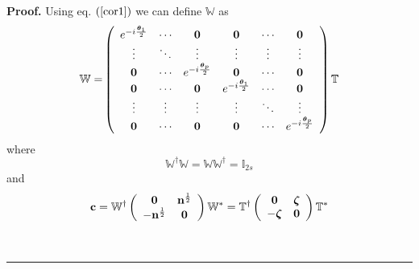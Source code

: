 \documentclass[aps,preprint]{revtex4}%
\newenvironment{proof}[1][Proof]{\noindent\textbf{#1.} }{\ \rule{0.5em}{0.5em}}
\begin{document}
\begin{proof}
Using eq. $\left(  \ref{cor1}\right)  $ we can define $\mathbb{W}$ as%
\begin{equation}
\mathbb{W=}\left(
\begin{array}
[c]{cccccc}%
e^{-i\frac{\boldsymbol{\theta}_{1}}{2}} & \mathbf{\cdots} & \mathbf{0} &
\mathbf{0} & \mathbf{\cdots} & \mathbf{0}\\
\mathbf{\vdots} & \mathbf{\ddots} & \mathbf{\vdots} & \mathbf{\vdots} &
\mathbf{\vdots} & \mathbf{\vdots}\\
\mathbf{0} & \mathbf{\cdots} & e^{-i\frac{\boldsymbol{\theta}_{p}}{2}} &
\mathbf{0} & \mathbf{\cdots} & \mathbf{0}\\
\mathbf{0} & \mathbf{\cdots} & \mathbf{0} & e^{-i\frac{\boldsymbol{\theta}_{1}%
}{2}} & \mathbf{\cdots} & \mathbf{0}\\
\mathbf{\vdots} & \mathbf{\vdots} & \mathbf{\vdots} & \mathbf{\vdots} &
\mathbf{\ddots} & \mathbf{\vdots}\\
\mathbf{0} & \mathbf{\cdots} & \mathbf{0} & \mathbf{0} & \mathbf{\cdots} &
e^{-i\frac{\boldsymbol{\theta}_{p}}{2}}%
\end{array}
\right)  \mathbb{T}%
\end{equation}
where
\begin{equation}
\mathbb{W}^{\dagger}\mathbb{W=WW}^{\dagger}\mathbb{=I}_{2s}%
\end{equation}
and
\begin{equation}
\mathbf{c}=\mathbb{W}^{\dagger}\left(
\begin{array}
[c]{cc}%
\mathbf{0} & \mathbf{n}^{\frac{1}{2}}\\
-\mathbf{n}^{\frac{1}{2}} & \mathbf{0}%
\end{array}
\right)  \mathbb{W}^{\ast}=\mathbb{T}^{\dagger}\left(
\begin{array}
[c]{cc}%
\mathbf{0} & \boldsymbol{\zeta}\\
-\boldsymbol{\zeta} & \mathbf{0}%
\end{array}
\right)  \mathbb{T}^{\ast} \label{cex}%
\end{equation}

\end{proof}
\end{document}

